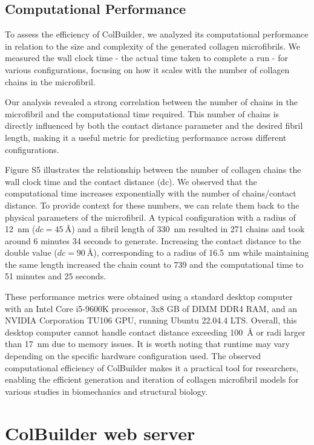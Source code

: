 \documentclass[10pt,letterpaper]{article}
\begin{document}
\subsection*{Computational Performance}\label{subsec5}

To assess the efficiency of ColBuilder, we analyzed its computational performance in relation to the size and complexity of the generated collagen microfibrils. We measured the wall clock time - the actual time taken to complete a run - for various configurations, focusing on how it scales with the number of collagen chains in the microfibril.

Our analysis revealed a strong correlation between the number of chains in the microfibril and the computational time required. This number of chains is directly influenced by both the contact distance parameter and the desired fibril length, making it a useful metric for predicting performance across different configurations.

Figure S5 illustrates the relationship between the number of collagen chains the wall clock time and the contact distance (dc). We observed that the computational time increases exponentially with the number of chains/contact distance. To provide context for these numbers, we can relate them back to the physical parameters of the microfibril. A typical configuration with a radius of \SI{12}{\nano\meter} (\(dc=\SI{45}{\angstrom}\)) and a fibril length of \SI{330}{\nano\meter} resulted in 271 chains and took around 6 minutes 34 seconds to generate. Increasing the contact distance to the double value (\(dc=\SI{90}{\angstrom}\)), corresponding to a radius of \SI{16.5}{\nano\meter}  while maintaining the same length increased the chain count to 739 and the computational time to 51 minutes and 25 seconds. 

These performance metrics were obtained using a standard desktop computer with an Intel Core i5-9600K processor, 3x8 GB of DIMM DDR4 RAM, and an NVIDIA Corporation TU106 GPU, running Ubuntu 22.04.4 LTS. Overall, this desktop computer cannot handle contact distance exceeding \SI{100}{\angstrom} or radi larger than \SI{17}{\nano\meter} due to memory issues. It is worth noting that runtime may vary depending on the specific hardware configuration used. The observed computational efficiency of ColBuilder makes it a practical tool for researchers, enabling the efficient generation and iteration of collagen microfibril models for various studies in biomechanics and structural biology.

\section*{ColBuilder web server}
\end{document}

